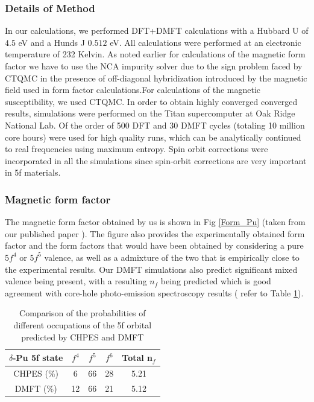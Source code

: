 \documentclass[10pt]{ruthesis}
\begin{document}
{\subsubsection{Details of Method}

In our calculations, we performed  DFT+DMFT calculations with a Hubbard U of $4.5$ eV and a Hunds J $0.512$ eV. All calculations were performed at an electronic temperature of 232 Kelvin. As noted earlier for calculations of the magnetic form factor we have to use the NCA impurity solver due to the sign problem faced by CTQMC in the presence of off-diagonal hybridization introduced by the magnetic field used in form factor calculations.For calculations of the magnetic susceptibility, we used CTQMC. In order to obtain highly converged converged results, simulations were performed on the Titan supercomputer at Oak Ridge National Lab. Of the order of 500 DFT and 30 DMFT cycles (totaling 10 million core hours) were used for high quality runs, which can be analytically continued to real frequencies using maximum entropy. Spin orbit corrections were incorporated in all the simulations since spin-orbit corrections are very important in 5f materials.

\subsubsection{Magnetic form factor}



The magnetic form factor obtained by us is shown in Fig \ref{Form_Pu} (taken from our published paper \cite{Me_Pu}). The figure also provides the experimentally obtained form factor and the form factors that would have been obtained by considering a pure $5f^4$ or $5f^5$ valence, as well as a admixture of the two that is empirically close to the experimental results. Our DMFT simulations also predict significant mixed valence being present, with a resulting $n_f$  being predicted which is good agreement with core-hole photo-emission spectroscopy results \cite{Pu_CHPES} ( refer to Table \ref{Table_Pu}).



\begin{table}[H]
\begin{center}
\begin{tabular}{|c|c|c|c|c|}
\hline
$\delta$-Pu 5f state & $f^4$& $f^5$ & $f^6$ & Total n$_f$ \\
\hline
CHPES ($\%$) & 6 & 66 & 28 & 5.21\\   
\hline
DMFT ($\%$) & 12 & 66 & 21 & 5.12 \\ 
\hline
\end{tabular}
\caption{Comparison of the probabilities of different occupations of the 5f orbital predicted by CHPES and DMFT \label{Table_Pu}}
\end{center}
\end{table}

}
\end{document}
